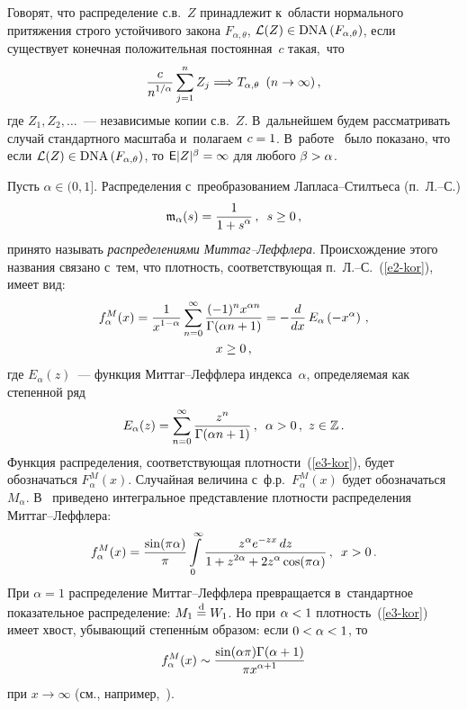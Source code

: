 \begin{multicols}{2}
Говорят, что распределение с.в.~$Z$ принадлежит 
к~об\-ласти нормального притяжения строго устойчивого закона
$F_{\alpha,\theta}$, $\mathcal{L}(Z)\hm\in \mathrm{DNA}\,(F_{\alpha,\theta})$,
если существует конечная положительная постоянная~$c$ та\-кая,~что
$$
\displaystyle\frac{\displaystyle c\mathstrut}{\displaystyle n^{1/\alpha}\mathstrut}\sum\limits_{j=1}^nZ_j\Longrightarrow
T_{\alpha,\theta}\enskip (n\to\infty)\,,
$$
где $Z_1,Z_2,\ldots$~--- независимые копии с.в.~$Z$. В~дальнейшем будем
рассматривать случай стандартного масштаба и~полагаем $c\hm=1$. 
В~работе~\cite{Tucker1975} было показано, что если $\mathcal{L}(Z)\hm\in
\mathrm{DNA}\,(F_{\alpha,\theta})$, то ${\sf E}|Z|^{\beta}\hm=\infty$ для любого
$\beta\hm>\alpha$.

Пусть $\alpha\in(0,1]$. Распределения с~преобразованием
Лап\-ла\-са--Стилть\-еса (п.~Л.--С.)
\begin{equation}
\mathfrak{m}_{\alpha}(s)=\displaystyle\frac{\displaystyle 1\mathstrut}{\displaystyle 1+s^{\alpha}\mathstrut}\,,\enskip s\ge0\,,
\label{e2-kor}
\end{equation}
принято называть {\it распределениями Мит\-таг--Леф\-фле\-ра}.
Происхождение этого названия связано с~тем, что плотность,
соответствующая п.~Л.--С.~(\ref{e2-kor}), имеет вид:
\begin{multline}
f_{\alpha}^{M}(x)=\displaystyle\frac{\displaystyle 1\mathstrut}{\displaystyle x^{1-\alpha}\mathstrut}\sum\limits_{n=0}^{\infty}\displaystyle\frac{\displaystyle (-1)^nx^{\alpha
n}\mathstrut}{\displaystyle \Gamma(\alpha n+1)\mathstrut}=-\displaystyle\frac{\displaystyle d\mathstrut}{\displaystyle dx\mathstrut}\,E_{\alpha}\left(-x^{\alpha}\right)\,,\\
x\ge0\,,
\label{e3-kor}
\end{multline}
где $E_{\alpha}(z)$~--- функция Мит\-таг--Леф\-фле\-ра индекса~$\alpha$,
определяемая как степенной ряд
$$
E_{\alpha}(z)=\sum\limits_{n=0}^{\infty}\displaystyle\frac{\displaystyle z^n\mathstrut}{\displaystyle \Gamma(\alpha
n+1)\mathstrut}\,,\enskip \alpha>0\,,\ z\in\mathbb{Z}\,.
$$
Функция распределения, соответствующая плот\-ности~(\ref{e3-kor}), будет обозначаться
$F_{\alpha}^{M}(x)$. Случайная величина с~ф.р.~$F_{\alpha}^{M}(x)$ будет
обозначаться~$M_{\alpha}$. В~\cite{KorolevZeifman2016b} приведено
интегральное представление плотности распределения Мит\-таг--Леф\-фле\-ра:
$$
f_{\alpha}^{M}(x)=\displaystyle\frac{\displaystyle \sin(\pi\alpha)\mathstrut}{\displaystyle \pi\mathstrut}\int\limits_{0}^{\infty}\displaystyle\frac{\displaystyle 
z^{\alpha}e^{-zx}\,dz\mathstrut}{\displaystyle 1+z^{2\alpha}+2z^{\alpha}\cos(\pi\alpha)\mathstrut}\,,\enskip
x>0\,.
$$
При $\alpha=1$ распределение Мит\-таг--Леф\-фле\-ра превращается 
в~стандартное показательное распределение: $M_1\stackrel{\mathrm{d}}{=} W_1$. Но при
$\alpha\hm<1$ плотность~(\ref{e3-kor}) имеет хвост, убывающий степенн$\acute{\mbox{ы}}$м
образом: если $0\hm<\alpha\hm<1$, то
$$
f_\alpha^{M}(x)\sim \fr{\sin(\alpha\pi)\Gamma(\alpha+1)}{\pi
x^{\alpha+1}}%
$$
при $x\to\infty$ (см., например,~\cite{Kilbas2014}).


\end{multicols}
